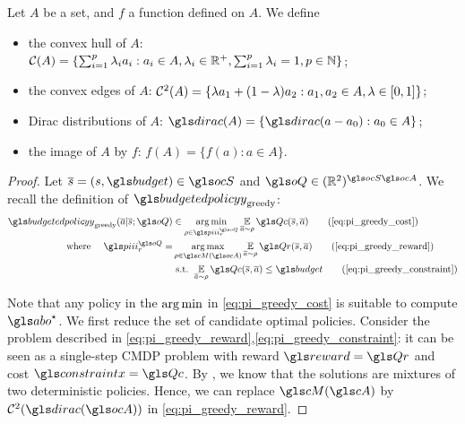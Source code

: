 \begin{subappendices}
\subsection{}
\label{sec:proof_pi_hull}
\begin{definition}
	\begin{leftbar}[defnbar]
	Let $A$ be a set, and $f$ a function defined on $A$. We define
	
	\begin{itemize}
		\item the convex hull of $A$: $\mathcal{C}(A) = \{\sum_{i=1}^p \lambda_i a_i: a_i\in A, \lambda_i\in\mathbb{R}^+, \sum_{i=1}^p \lambda_i = 1, p\in\mathbb{N}\}$;
		\item the convex edges of $A$: $\mathcal{C}^2(A) = \{\lambda a_1 + (1-\lambda)a_2: a_1, a_2\in A, \lambda\in[0, 1]\}$;
		\item Dirac distributions of $A$: $\dirac(A) = \{\dirac(a-a_0): a_0\in A\}$;
		\item the image of $A$ by $f$: $f(A) = \{f(a): a\in A\}$.
	\end{itemize}
\end{leftbar}
\end{definition}

\begin{proof}
Let $\os=(s,\budget)\in\ocS$ and $\oQ\in(\Real^2)^{\ocS\ocA}$. We recall the definition of $\budgetedpolicy_\text{greedy}$:
    \begin{subequations}
        \begin{align}
            \budgetedpolicy_\text{greedy}(\oa|\os; \oQ) &\in \argmin_{\rho\in\policies_r^{\oQ}} \expectedvalueover{\oa\sim\rho}\Qc(\os, \oa) \tag{\ref{eq:pi_greedy_cost}}\\
            \text{where }\quad\policies_r^{\oQ} = &\argmax_{\rho\in\cM(\ocA)} \expectedvalueover{\oa\sim\rho} \Qr(\os, \oa) \tag{\ref{eq:pi_greedy_reward}}\\
            & \text{ s.t. }  \expectedvalueover{\oa\sim\rho} \Qc(\os, \oa) \leq \budget \tag{\ref{eq:pi_greedy_constraint}}
        \end{align}
    \end{subequations}

    Note that any policy in the $\operatorname*{arg\,min}$ in \eqref{eq:pi_greedy_cost} is suitable to compute $\abo^{\star}$.
    We first reduce the set of candidate optimal policies.
    Consider the problem described in \eqref{eq:pi_greedy_reward},\eqref{eq:pi_greedy_constraint}: it can be seen as a single-step \gls{CMDP} problem with reward $\reward=\Qr$ and cost $\constraint=\Qc$. By \citep[Theorem 4.4][]{BEUTLER1985236}, we know that the solutions are mixtures of two deterministic policies. Hence, we can replace $\cM(\cA)$ by $\cC^2(\dirac(\ocA))$ in \eqref{eq:pi_greedy_reward}.


\end{proof}
\end{subappendices}
